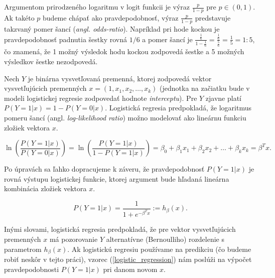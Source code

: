 \begin{center}
\end{center}

Argumentom prirodzeného logaritmu v logit funkcii je výraz \( \frac{p}{1 - p} \) pre \( p \in (0, 1) \).
Ak takéto \(p\) budeme chápať ako pravdepodobnosť, výraz \( \frac{p}{1 - p} \) predstavuje takzvaný pomer šancí (\emph{angl. odds-ratio}).
Napríklad pri hode kockou je pravdepodobnosť padnutia šestky rovná \( 1/6 \) a pomer šancí je \( \frac{\frac{1}{6}}{1 - \frac{1}{6}} = \frac{\frac{1}{6}}{\frac{5}{6}} = \frac{1}{5} = 1 : 5\),
čo znamená, že 1 možný výsledok hodu kockou zodpovedá šestke a 5 možných výsledkov šestke nezodpovedá.

Nech \( Y \) je binárna vysvetľovaná premenná, ktorej zodpovedá vektor vysvetľujúcich premenných \( x = (1, x_1, x_2, \ldots, x_k) \)
(jednotka na začiatku bude v modeli logistickej regresie zodpovedať hodnote \emph{interceptu}).
Pre \( Y \) zjavne platí \( P(Y = 1|x) = 1 - P(Y = 0|x) \).
Logistická regresia predpokladá, že logaritmus pomeru šancí (angl. \emph{log-likelihood ratio}) možno modelovať ako lineárnu funkciu zložiek vektora \( x \).

\[
\ln \left( \frac{P(Y = 1|x)}{P(Y = 0|x)} \right) = \ln \left( \frac{P(Y = 1|x)}{1 - P(Y = 1|x)} \right) = \beta_0 + \beta_1 x_1 + \beta_2 x_2 + \ldots + \beta_k x_k = \beta^T x.
\]

Po úpravách sa ľahko dopracujeme k záveru, že pravdepodobnosť \( P(Y = 1|x) \) je rovná výstupu logistickej funkcie, ktorej argument bude hľadaná lineárna kombinácia zložiek vektora \( x \).

\begin{equation} \label{logistic_regression}
P(Y = 1|x) = \frac{1}{1 + e^{-\beta^T x}} := h_\beta(x).
\end{equation}

Inými slovami, logistická regresia predpokladá, že pre vektor vysvetľujúcich premenných \(x\) má pozorovanie \(Y\)
alternatívne (Bernoulliho) rozdelenie s parametrom \(h_\beta(x)\).
Ak logistickú regresiu používame na predikciu (čo budeme robiť neskôr v tejto práci),
vzorec (\ref{logistic_regression}) nám poslúži na výpočet pravdepodobnosti \( P(Y = 1|x) \) pri danom novom \( x \).

